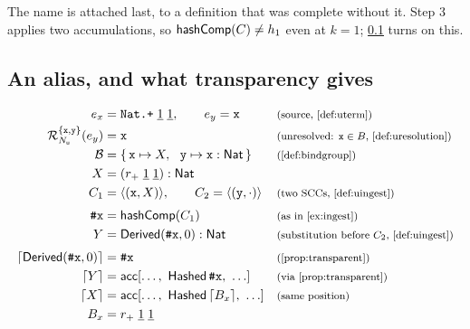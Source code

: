 \documentclass[11pt]{article}
\theoremstyle{definition}
\theoremstyle{plain}
\theoremstyle{remark}
\begin{document}
The name is attached last, to a definition that was complete without it. Step 3 applies two
accumulations, so $\mathsf{hashComp}(C) \neq h_1$ even at $k = 1$; \cref{ex:transparency} turns on this.

\subsection{An alias, and what transparency gives}\label{ex:transparency}

\[
\begin{array}{r@{\;}l@{\quad}l}
  e_x &= \uapp{\uapp{\uvar{\texttt{Nat.+}}}{\unat{1}}}{\unat{1}},
  \qquad e_y = \uvar{\texttt{x}}
    & \just{source, \cref{def:uterm}} \\[3pt]
  \Res{\{\texttt{x},\texttt{y}\}}{\UNames}(e_y) &= \uvar{\texttt{x}}
    & \just{unresolved: $\texttt{x} \in B$, \cref{def:uresolution}} \\[3pt]
  \bg &= \{\,\texttt{x} \mapsto X,\ \ \texttt{y} \mapsto \uann{\uvar{\texttt{x}}}{\TNat}\,\}
    & \just{\cref{def:bindgroup}} \\[3pt]
  X &= \uann{(\uapp{\uapp{\uref{r_{+}}}{\unat 1}}{\unat 1})}{\TNat} & \\[3pt]
  C_1 &= \langle(\texttt{x}, X)\rangle,\qquad C_2 = \langle(\texttt{y}, \cdot)\rangle
    & \just{two SCCs, \cref{def:uingest}} \\[6pt]
  \texttt{\#x} &= \comphash(C_1)
    & \just{as in \cref{ex:ingest}} \\[3pt]
  Y &= \uann{\uref{\UDer{\texttt{\#x}}{0}}}{\TNat}
    & \just{substitution before $C_2$, \cref{def:uingest}} \\[6pt]
  \uhashc{\uref{\UDer{\texttt{\#x}}{0}}} &= \texttt{\#x}
    & \just{\cref{prop:transparent}} \\[3pt]
  \uhashc{Y} &= \mathsf{acc}[\ldots,\ \mathsf{Hashed}\,\texttt{\#x},\ \ldots]
    & \just{via \cref{prop:transparent}} \\[3pt]
  \uhashc{X} &= \mathsf{acc}[\ldots,\ \mathsf{Hashed}\,\uhashc{B_x},\ \ldots]
    & \just{same position} \\[3pt]
  B_x &= \uapp{\uapp{\uref{r_{+}}}{\unat 1}}{\unat 1} &
\end{array}
\]
\end{document}
